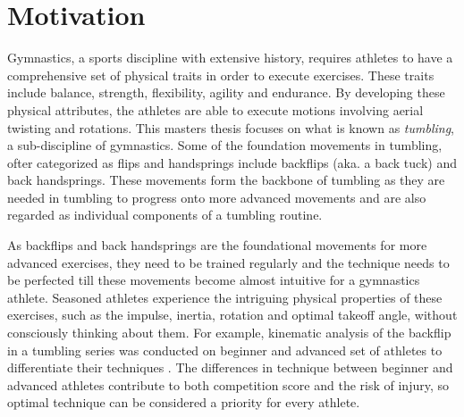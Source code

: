 \section{Motivation}

Gymnastics, a sports discipline with extensive history, requires athletes to have a comprehensive set of physical traits in order to execute exercises. These traits include balance, strength, flexibility, agility and endurance. By developing these physical attributes, the athletes are able to execute motions involving aerial twisting and rotations. This masters thesis focuses on what is known as \textit{tumbling}, a sub-discipline of gymnastics. Some of the foundation movements in tumbling, ofter categorized as flips and handsprings include backflips (aka. a back tuck) and back handsprings. These movements form the backbone of tumbling as they are needed in tumbling to progress onto more advanced movements and are also regarded as individual components of a tumbling routine.

As backflips and back handsprings are the foundational movements for more advanced exercises, they need to be trained regularly and the technique needs to be perfected till these movements become almost intuitive for a gymnastics athlete. Seasoned athletes experience the intriguing physical properties of these exercises, such as the impulse, inertia, rotation and optimal takeoff angle, without consciously thinking about them. For example, kinematic analysis of the backflip in a tumbling series was conducted on beginner and advanced set of athletes to differentiate their techniques \cite{Burgess2001KINEMATICAO}. The differences in technique between beginner and advanced athletes contribute to both competition score and the risk of injury, so optimal technique can be considered a priority for every athlete.

